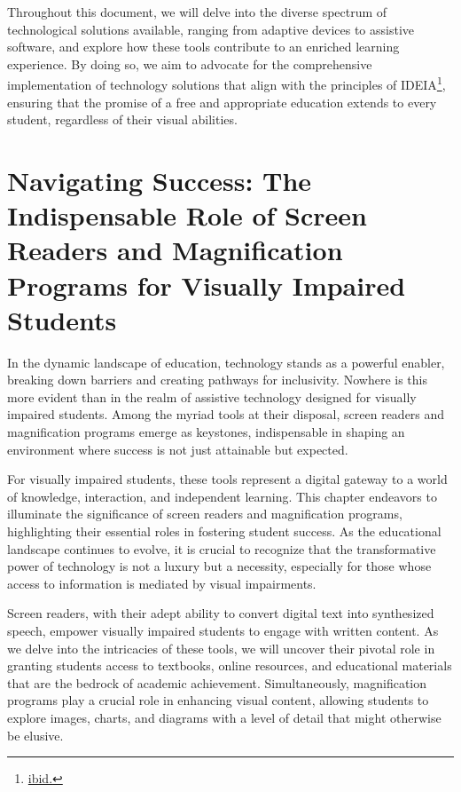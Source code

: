 \documentclass[14pt,letterpaper,twoside]{extreport}
\begin{document}
 Throughout this document, we will delve into the diverse spectrum of technological solutions available, ranging from adaptive devices to assistive software, and explore how these tools contribute to an enriched learning experience. By doing so, we aim to advocate for the comprehensive implementation of technology solutions that align with the principles of IDEIA\footnote{\href{https://sites.ed.gov/idea/statuteregulations/}{ibid.}}, ensuring that the promise of a free and appropriate education extends to every student, regardless of their visual abilities.

\pagebreak
\fancyhead[RO]{\lastxmark}
\fancyhead[LE]{\firstxmark}
\fancyfoot[C]{}

\hypertarget{vision-assistive-technology-laptop-computer-requirements}{\chapter[Navigating Success: The Indispensable Role of Screen Readers and Magnification Programs for Visually Impaired Students]{Navigating Success: The Indispensable Role of Screen Readers and Magnification Programs for Visually Impaired Students}\label{vision-assistive-technology-laptop-computer-requirements} }
In the dynamic landscape of education, technology stands as a powerful enabler, breaking down barriers and creating pathways for inclusivity. Nowhere is this more evident than in the realm of assistive technology designed for visually impaired students. Among the myriad tools at their disposal, screen readers and magnification programs emerge as keystones, indispensable in shaping an environment where success is not just attainable but expected.

For visually impaired students, these tools represent a digital gateway to a world of knowledge, interaction, and independent learning. This chapter endeavors to illuminate the significance of screen readers and magnification programs, highlighting their essential roles in fostering student success. As the educational landscape continues to evolve, it is crucial to recognize that the transformative power of technology is not a luxury but a necessity, especially for those whose access to information is mediated by visual impairments.

Screen readers, with their adept ability to convert digital text into synthesized speech, empower visually impaired students to engage with written content. As we delve into the intricacies of these tools, we will uncover their pivotal role in granting students access to textbooks, online resources, and educational materials that are the bedrock of academic achievement. Simultaneously, magnification programs play a crucial role in enhancing visual content, allowing students to explore images, charts, and diagrams with a level of detail that might otherwise be elusive.
\end{document}
